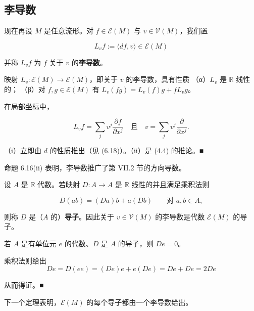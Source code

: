 \subsection*{李导数}

现在再设 $ M $ 是任意流形。对 $ f \in \mathcal{E}(M) $ 与 $ v \in \mathcal{V}(M) $，我们置

\[
L_{v} f := \langle df, v \rangle \in \mathcal{E}(M)
\]

并称 $ L_{v} f $ 为 $ f $ 关于 $ v $ 的\textbf{李导数}。

\begin{proposition}

\begin{subitems}
\item

映射 $ L_{v} : \mathcal{E}(M) \to \mathcal{E}(M) $，即关于 $ v $ 的李导数，具有性质
（α）$ L_{v} $ 是 $ \mathbb{R} $ 线性的；
（β）对 $ f, g \in \mathcal{E}(M) $ 有 $ L_{v}(fg) = L_{v}(f) g + f L_{v} g $。

\item

在局部坐标中，

\[
L_{v} f = \sum_{j} v^{j} \frac{\partial f}{\partial x^{j}} \quad \text{且} \quad v = \sum_{j} v^{j} \frac{\partial}{\partial x^{j}} .
\]

\proofhead
（i）立即由 $ d $ 的性质推出（见 (6.18)）。（ii）是 (4.4) 的推论。\nobreak\hspace{0.35em}■
\end{subitems}

\end{proposition}

\begin{remark}

\begin{items}
\item

命题 6.16(ii) 表明，李导数推广了第 VII.2 节的方向导数。

\item

设 $ A $ 是 $ \mathbb{R} $ 代数。若映射 $ D : A \to A $ 是 $ \mathbb{R} $ 线性的并且满足乘积法则

\[
D(ab) = (Da)b + a(Db) \qquad \text{对 } a, b \in A ,
\]

则称 $ D $ 是（$ A $ 的）\textbf{导子}。因此关于 $ v \in \mathcal{V}(M) $ 的李导数是代数 $ \mathcal{E}(M) $ 的导子。

\item

若 $ A $ 是有单位元 $ e $ 的代数、$ D $ 是 $ A $ 的导子，则 $ De = 0 $。

\proofhead
乘积法则给出
\[
De = D(ee) = (De)e + e(De) = De + De = 2De
\]

从而得证。\nobreak\hspace{0.35em}■

\end{items}

下一个定理表明，$ \mathcal{E}(M) $ 的每个导子都由一个李导数给出。

\end{remark}

